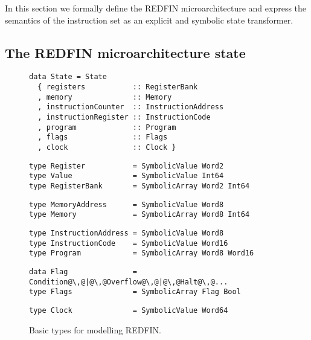 
In this section we formally define the REDFIN microarchitecture and express the
semantics of the instruction set as an explicit and symbolic state transformer.

\vspace{-1mm}
\subsection{The REDFIN microarchitecture state}

\begin{figure}[t]
\begin{verbatim}
data State = State
  { registers           :: RegisterBank
  , memory              :: Memory
  , instructionCounter  :: InstructionAddress
  , instructionRegister :: InstructionCode
  , program             :: Program
  , flags               :: Flags
  , clock               :: Clock }
\end{verbatim}
\vspace{0.5mm}
\begin{verbatim}
type Register           = SymbolicValue Word2
type Value              = SymbolicValue Int64
type RegisterBank       = SymbolicArray Word2 Int64
\end{verbatim}
\vspace{0.5mm}
\begin{verbatim}
type MemoryAddress      = SymbolicValue Word8
type Memory             = SymbolicArray Word8 Int64
\end{verbatim}
\vspace{0.5mm}
\begin{verbatim}
type InstructionAddress = SymbolicValue Word8
type InstructionCode    = SymbolicValue Word16
type Program            = SymbolicArray Word8 Word16
\end{verbatim}
\vspace{0.5mm}
\begin{verbatim}
data Flag               = Condition@\,@|@\,@Overflow@\,@|@\,@Halt@\,@...
type Flags              = SymbolicArray Flag Bool
\end{verbatim}
\vspace{0.5mm}
\begin{verbatim}
type Clock              = SymbolicValue Word64
\end{verbatim}
\vspace{-3mm}
\caption{Basic types for modelling REDFIN.\label{fig-types}}
\vspace{-5mm}
\end{figure}

